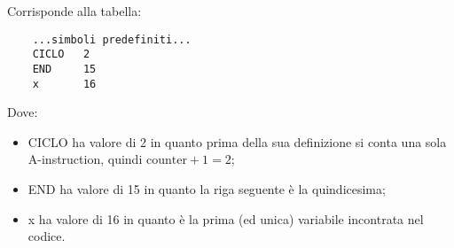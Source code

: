 \documentclass[12pt]{article}
\begin{document}
Corrisponde alla tabella:
\begin{lstlisting}
    ...simboli predefiniti...
    CICLO   2
    END     15
    x       16
\end{lstlisting}
Dove:
\begin{itemize}
    \item CICLO ha valore di 2 in quanto prima della sua definizione si conta una sola A-instruction, quindi $\text{counter}+1=2$;
    \item END ha valore di 15 in quanto la riga seguente è la quindicesima;
    \item x ha valore di 16 in quanto è la prima (ed unica) variabile incontrata nel codice.
\end{itemize}
\end{document}
